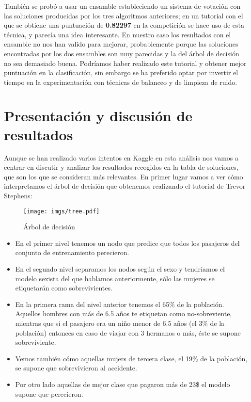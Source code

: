 \documentclass[10pt,a4paper]{article}
\begin{document}
También se probó a usar un ensamble estableciendo un sistema de votación con las soluciones producidas por los tres algoritmos anteriores; en un tutorial con el que se obtiene una puntuación de \textbf{0.82297} en la competición se hace uso de esta técnica, y parecía una idea interesante. En nuestro caso los resultados con el ensamble no nos han valido para mejorar, probablemente porque las soluciones encontradas por los dos ensambles son muy parecidas y la del árbol de decisión no sea demasiado buena. Podríamos haber realizado este tutorial y obtener mejor puntuación en la clasificación, sin embargo se ha preferido optar por invertir el tiempo en la experimentación con técnicas de balanceo y de limpieza de ruido.

\section{Presentación y discusión de resultados}

Aunque se han realizado varios intentos en Kaggle en esta análisis nos vamos a centrar en discutir y analizar los resultados recogidos en la tabla de soluciones, que son los que se consideran más relevantes. En primer lugar vamos a ver cómo interpretamos el árbol de decisión que obtenemos realizando el tutorial de Trevor Stephens:

\begin{figure}[H]
  \centering
  \texttt{[image: imgs/tree.pdf]}
  \caption{Árbol de decisión}
\end{figure}

\begin{itemize}
\item En el primer nivel tenemos un nodo que predice que todos los pasajeros del conjunto de entrenamiento perecieron.
\item En el segundo nivel separamos los nodos según el sexo y tendríamos el modelo sexista del que hablamos anteriormente, sólo las mujeres se etiquetarán como sobrevivientes.
\item En la primera rama del nivel anterior tenemos el 65\% de la población. Aquellos hombres con más de 6.5 años te etiquetan como no-sobreviente, mientras que si el pasajero era un niño menor de 6.5 años (el 3\% de la población) entonces en caso de viajar con 3 hermanos o más, éste se supone sobreviviente.
\item Vemos también cómo aquellas mujers de tercera clase, el 19\% de la población, se supone que sobrevivieron al accidente.
\item Por otro lado aquellas de mejor clase que pagaron más de 23\$ el modelo supone que perecieron.
\end{itemize}
\end{document}
